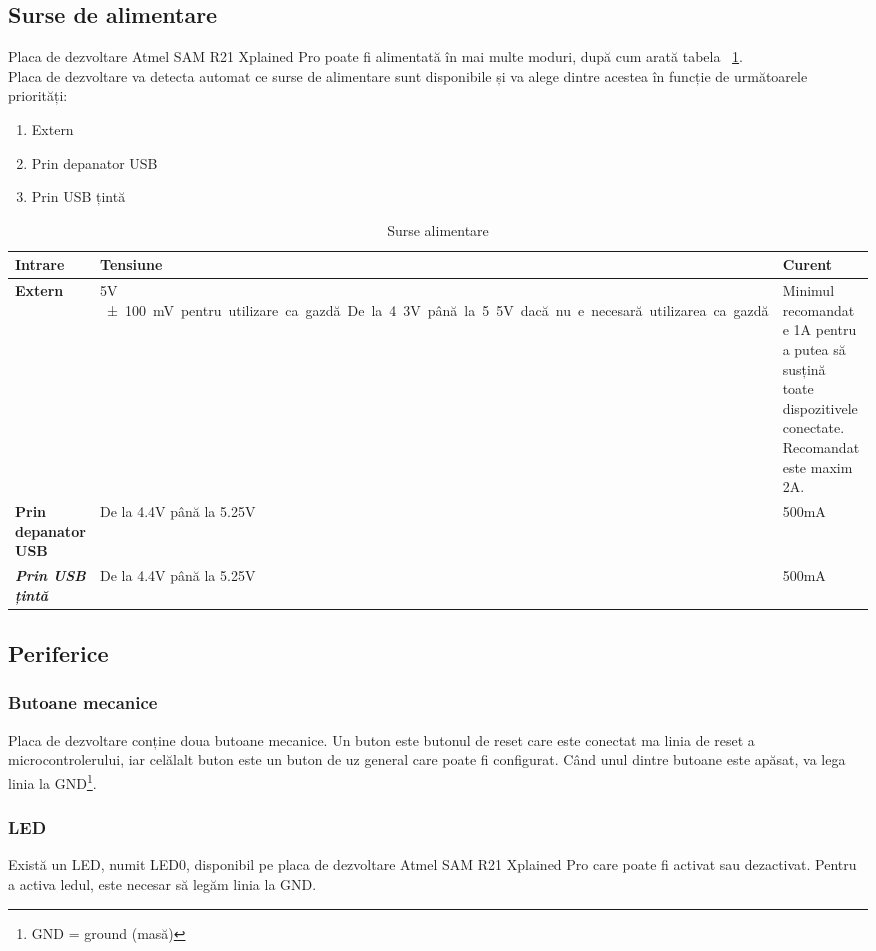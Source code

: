 \documentclass[12pt,a4paper]{report}
\begin{document}
\subsection{Surse de alimentare}
Placa de dezvoltare Atmel SAM R21 Xplained Pro poate fi alimentată în mai multe moduri, după cum arată tabela ~\ref{tab:surse}. \\
Placa de dezvoltare va detecta automat ce surse de alimentare sunt disponibile și va alege dintre acestea în funcție de următoarele priorități:
\begin{enumerate}
	\item{Extern}
	\item{Prin depanator USB}
	\item{Prin USB țintă}
\end{enumerate}

\begin{table}[th]\small\linespread{1}
\caption{Surse alimentare}
\label{tab:surse}
\begin{tabular}{l >{\raggedright\arraybackslash}p{8cm} >{\raggedright\arraybackslash}p{4cm}}
\textbf{Intrare} & \textbf{Tensiune} & \textbf{Curent} \\\hline
\textbf{Extern} & 5V \SI{\pm 100}mV pentru utilizare ca gazdă.  De la 4.3V până la 5.5V dacă nu e necesară utilizarea ca gazdă & Minimul recomandat e 1A pentru a putea să susțină toate dispozitivele conectate. Recomandat este maxim 2A.\\\hline
\textbf{Prin depanator USB} & De la 4.4V până la 5.25V & 500mA \\
\hline
\textbf{\textit{Prin USB țintă}} & De la 4.4V până la 5.25V & 500mA \\
\hline
\end{tabular}
\end{table}

\subsection{Periferice}
\subsubsection{Butoane mecanice}
Placa de dezvoltare conține doua butoane mecanice. Un buton este butonul de reset care este conectat ma linia de reset a microcontrolerului, iar celălalt buton este un buton de uz general care poate fi configurat. Când unul dintre butoane este apăsat, va lega linia la GND\footnote{GND = ground (masă)}.

\subsubsection{LED}
Există un LED, numit LED0, disponibil pe placa de dezvoltare Atmel SAM R21 Xplained Pro care poate fi activat sau dezactivat. Pentru a activa ledul, este necesar să legăm linia la GND.
\end{document}
